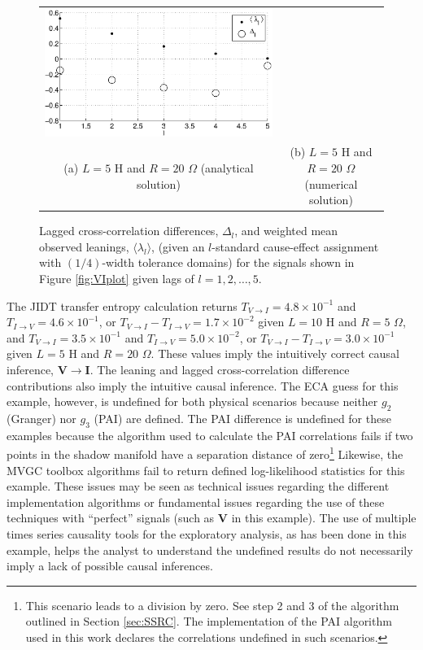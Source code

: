 \documentclass{article}[10pt]
\begin{document}
\begin{figure}[ht]
\begin{center}
\begin{tabular}{cc}
\includegraphics[scale=0.48]{IRCircuitResponseExampleL5R20_LandLCC_num.eps} \\
(a) $L=5$ H and $R=20$ $\Omega$ (analytical solution) & (b) $L=5$ H and $R=20$ $\Omega$ (numerical solution)
\end{tabular}
\end{center}
\caption{Lagged cross-correlation differences, $\Delta_l$, and weighted mean observed leanings, $\langle\lambda_l\rangle$, (given an $l$-standard cause-effect assignment with $(1/4)$-width tolerance domains) for the signals shown in Figure \ref{fig:VIplot} given lags of $l=1,2,\ldots,5$.}
\label{fig:VILandLCC}
\end{figure}

The JIDT transfer entropy calculation returns $T_{V\rightarrow I}=4.8\times 10^{-1}$ and $T_{I\rightarrow V}=4.6\times 10^{-1}$, or $T_{V\rightarrow I}-T_{I\rightarrow V}=1.7\times 10^{-2}$ given $L=10$ H and $R=5$ $\Omega$, and $T_{V\rightarrow I}=3.5\times 10^{-1}$ and $T_{I\rightarrow V}=5.0\times 10^{-2}$, or $T_{V\rightarrow I}-T_{I\rightarrow V}=3.0\times 10^{-1}$ given $L=5$ H and $R=20$ $\Omega$.  These values imply the intuitively correct causal inference, $\mathbf{V}\rightarrow\mathbf{I}$.  The leaning and lagged cross-correlation difference contributions also imply the intuitive causal inference.  The ECA guess for this example, however, is undefined for both physical scenarios because neither $g_2$ (Granger) nor $g_3$ (PAI) are defined.  The PAI difference is undefined for these examples because the algorithm used to calculate the PAI correlations fails if two points in the shadow manifold have a separation distance of zero\footnote{This scenario leads to a division by zero.  See step 2 and 3 of the algorithm outlined in Section \ref{sec:SSRC}.  The implementation of the PAI algorithm used in this work declares the correlations undefined in such scenarios.}  Likewise, the MVGC toolbox algorithms fail to return defined log-likelihood statistics for this example.  These issues may be seen as technical issues regarding the different implementation algorithms or fundamental issues regarding the use of these techniques with ``perfect'' signals (such as $\mathbf{V}$ in this example).  The use of multiple times series causality tools for the exploratory analysis, as has been done in this example, helps the analyst to understand the undefined results do not necessarily imply a lack of possible causal inferences.  
\end{document}
